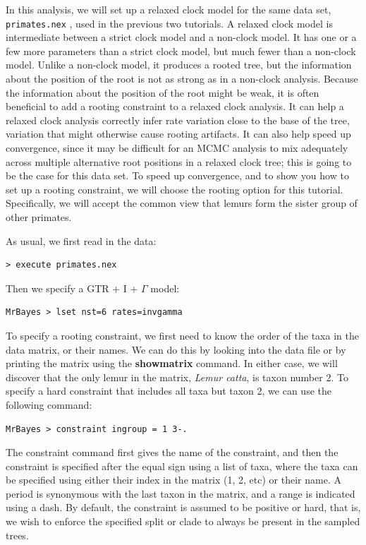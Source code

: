 \documentclass[12pt]{book}
\newcommand{\ttt}[1]{\texttt{#1} }
\begin{document}
In this analysis, we will set up a relaxed clock model for the same data set,
\ttt{primates.nex}, used in the previous two tutorials. A relaxed clock model is intermediate
between a strict clock model and a non-clock model. It has one or a few more parameters than a
strict clock model, but much fewer than a non-clock model. Unlike a non-clock model, it produces a
rooted tree, but the information about the position of the root is not as strong as in a non-clock
analysis.  Because the information about the position of the root might be weak, it is often
beneficial to add a rooting constraint to a relaxed clock analysis. It can help a relaxed clock
analysis correctly infer rate variation close to the base of the tree, variation that might
otherwise cause rooting artifacts. It can also help speed up convergence, since it may be difficult
for an MCMC analysis to mix adequately across multiple alternative root positions in a relaxed
clock tree; this is going to be the case for this data set. To speed up convergence, and to show
you how to set up a rooting constraint, we will choose the rooting option for this tutorial.
Specifically, we will accept the common view that lemurs form the sister group of other primates.

As usual, we first read in the data:

\begin{verbatim}
> execute primates.nex
\end{verbatim}

Then we specify a GTR + I + $\Gamma$ model:

\begin{verbatim}
MrBayes > lset nst=6 rates=invgamma
\end{verbatim}

To specify a rooting constraint, we first need to know the order of the taxa in the data matrix, or
their names. We can do this by looking into the data file or by printing the matrix using the
\textbf{showmatrix} command. In either case, we will discover that the only lemur in the matrix,
\textit{Lemur catta}, is taxon number 2. To specify a hard constraint that includes all taxa but
taxon 2, we can use the following command:

\begin{verbatim}
MrBayes > constraint ingroup = 1 3-.
\end{verbatim}

The constraint command first gives the name of the constraint, and then the constraint is specified
after the equal sign using a list of taxa, where the taxa can be specified using either their index
in the matrix (1, 2, etc) or their name. A period is synonymous with the last taxon in the matrix,
and a range is indicated using a dash. By default, the constraint is assumed to be positive or
hard, that is, we wish to enforce the specified split or clade to always be present in the sampled
trees.
\end{document}

